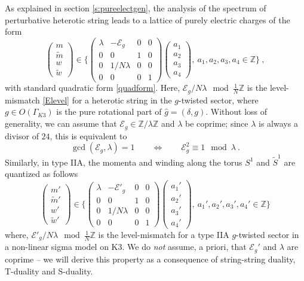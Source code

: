 \documentclass[a4paper,11pt]{article}
\newcommand{\ZZ}{\mathbb{Z}}
\newcommand{\E}{\mathcal{E}}
\numberwithin{equation}{section}
\def\be{\begin{equation}}
\def\ee{\end{equation}}
\begin{document}
As explained in section \ref{s:pureelectgen}, the analysis of the spectrum of perturbative heterotic string leads to a lattice of purely electric charges of the form
\be\label{hetlattice} \begin{pmatrix}
 m \\
 \tilde m\\
 w\\
 \tilde w\end{pmatrix}\in\{\begin{pmatrix}
 \lambda & -\E_g & 0 & 0\\
 0 & 0 & 1 & 0\\ 
 0 & 1/N\lambda & 0 & 0\\
 0 & 0 & 0 & 1
\end{pmatrix}\begin{pmatrix}
 a_1 \\
 a_2\\
 a_3\\
 a_4\end{pmatrix},\ a_1,a_2,a_3,a_4\in\ZZ\}\ ,
\ee with standard quadratic form \eqref{quadform}. Here, $\E_g/N\lambda\mod \frac{1}{N}\ZZ$ is the level-mismatch \eqref{Elevel} for a heterotic string in the $g$-twisted sector, where $g\in O(\Gamma_{K3})$ is the pure rotational part of $\hat g=(\delta,g)$. Without loss of generality, we can assume that $\E_g\in \ZZ/\lambda \ZZ$ and $\lambda$ be coprime; since $\lambda$ is always a divisor of $24$, this is equivalent to
\be\label{coprime2} \gcd(\E_g,\lambda)=1\qquad \Leftrightarrow \qquad \E_g^2\equiv 1\mod \lambda\ .
\ee
Similarly, in type IIA, the momenta and winding along the torus $S^1$ and $\tilde S^1$ are quantized as follows
\be\label{IIAlattice} \begin{pmatrix}
 m' \\
 \tilde m'\\
 w'\\
 \tilde w'\end{pmatrix}\in\{\begin{pmatrix}
 \lambda & -\E'_g & 0 & 0\\
 0 & 0 & 1 & 0\\ 
 0 & 1/N\lambda & 0 & 0\\
 0 & 0 & 0 & 1
\end{pmatrix}\begin{pmatrix}
 a_1' \\
 a_2'\\
 a_3'\\
 a_4'\end{pmatrix},\ a_1',a_2',a_3',a_4'\in\ZZ\}
\ee
where, $\E'_g/N\lambda\mod \frac{1}{N}\ZZ$ is the level-mismatch for a type IIA $g$-twisted sector in a non-linear sigma model on K3. We do \emph{not} assume, a priori, that $\E_g'$ and $\lambda$ are coprime -- we will derive this property as a consequence of string-string duality, T-duality and S-duality.
\end{document}
